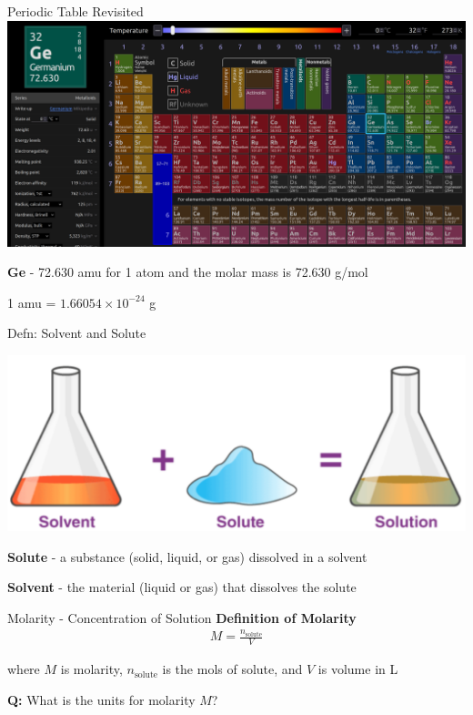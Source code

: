 \documentclass[11pt]{beamer}
\begin{document}
\begin{frame}{Periodic Table Revisited}
  \centering
  \includegraphics[width=\linewidth]{ptable}

  \textbf{Ge} - 72.630 amu for 1 atom and the molar mass is 72.630 g/mol

  1 amu = $1.66054\times 10^{-24}$ g
\end{frame}

\begin{frame}{Defn: Solvent and Solute}
  \begin{center}
    \includegraphics[width=0.75\linewidth]{solut_solv.png}
  \end{center}

  \textbf{Solute} - a substance (solid, liquid, or gas) dissolved in
  a solvent

  \textbf{Solvent} - the material (liquid or gas) that dissolves the
  solute
\end{frame}

\begin{frame}{Molarity - Concentration of Solution}
  \textbf{Definition of Molarity}
  \begin{align}
    M = \frac{n_\text{solute}}{V}
  \end{align}

  where $M$ is molarity, $n_\text{solute}$ is the mols of solute, and $V$ is volume in L

  \textbf{Q:} What is the units for molarity $M$?
\end{frame}
\end{document}
